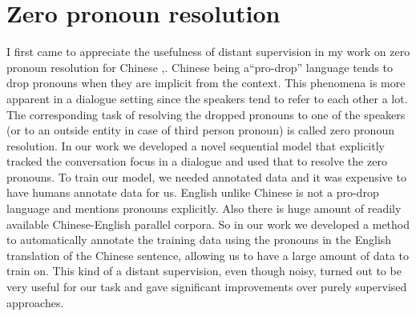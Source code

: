 \documentclass[11pt,a4paper]{article}
\begin{document}
\section{Zero pronoun resolution}
I first came to appreciate the usefulness of distant supervision in my work on zero pronoun resolution for Chinese \cite{rao-EtAl:2015:NAACL-HLT},. Chinese being a``pro-drop'' language tends to drop pronouns when they are implicit from the context. This phenomena is more apparent in a dialogue setting since the speakers tend to refer to each other a lot. The corresponding task of resolving the dropped pronouns to one of the speakers (or to an outside entity in case of third person pronoun) is called zero pronoun resolution. In our work we developed a novel sequential model that explicitly tracked the conversation focus in a dialogue and used that to resolve the zero pronouns. To train our model, we needed annotated data and it was expensive to have humans annotate data for us. English unlike Chinese is not a pro-drop language and mentions pronouns explicitly. Also there is huge amount of readily available Chinese-English parallel corpora. So in our work we developed a method to automatically annotate the training data using the pronouns in the English translation of the Chinese sentence, allowing us to have a large amount of data to train on. This kind of a distant supervision, even though noisy, turned out to be very useful for our task and gave significant improvements over purely supervised approaches.
\end{document}
